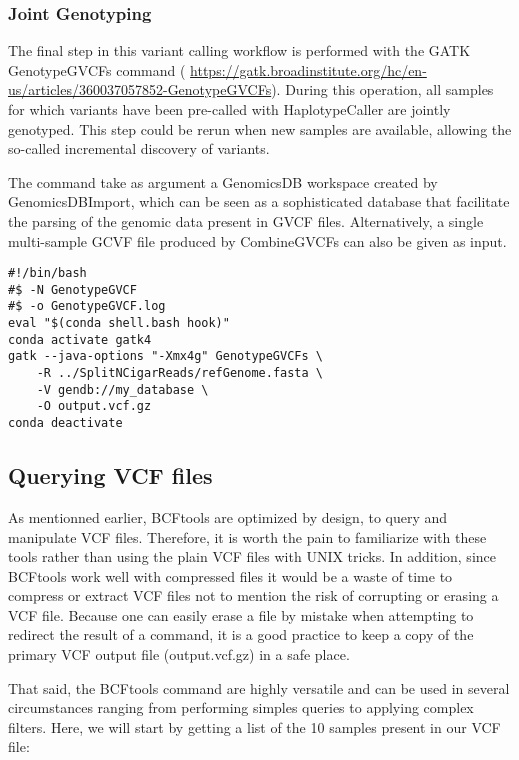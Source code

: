 \subsubsection{Joint Genotyping}

The final step in this variant calling workflow is performed with the GATK GenotypeGVCFs command (  \href{https://gatk.broadinstitute.org/hc/en-us/articles/360037057852-GenotypeGVCFs}{https://gatk.broadinstitute.org/hc/en-us/articles/360037057852-GenotypeGVCFs}). During this operation, all samples for which variants have been pre-called with HaplotypeCaller are jointly genotyped. This step could be rerun when new samples are available, allowing the so-called incremental discovery of variants.


The command take as argument a GenomicsDB workspace created by GenomicsDBImport, which can be seen as a sophisticated database that facilitate the parsing of the genomic data present in GVCF files. Alternatively, a single multi-sample GCVF file produced by CombineGVCFs can also be given as input.

\begin{verbatim}
#!/bin/bash
#$ -N GenotypeGVCF
#$ -o GenotypeGVCF.log
eval "$(conda shell.bash hook)"
conda activate gatk4
gatk --java-options "-Xmx4g" GenotypeGVCFs \
	-R ../SplitNCigarReads/refGenome.fasta \
	-V gendb://my_database \
	-O output.vcf.gz
conda deactivate
\end{verbatim}

\subsection{Querying VCF files}


As mentionned earlier, BCFtools are optimized by design, to query and manipulate VCF files. Therefore, it is worth the pain to familiarize with these tools rather than using the plain VCF files with UNIX tricks. In addition, since BCFtools work well with compressed files it would be a waste of time to compress or extract VCF files not to mention the risk of corrupting or erasing a VCF file. Because one can easily erase a file by mistake when attempting to redirect the result of a command, it is a good practice to keep a copy of the primary VCF output file (output.vcf.gz) in a safe place.

That said, the BCFtools command are highly versatile and can be used in several circumstances ranging from performing simples queries to applying complex filters. Here, we will start by getting a list of the 10 samples present in our VCF file:

